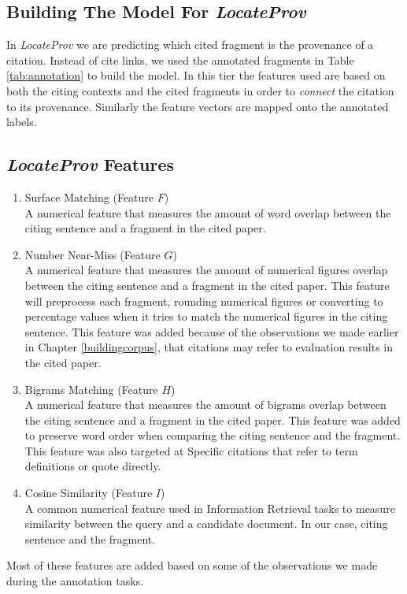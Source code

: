 \subsection*{Building The Model For {\it LocateProv}}
In {\it LocateProv} we are predicting which cited fragment is the provenance of a citation. Instead of cite links, we used the annotated fragments in Table \ref{tab:annotation} to build the model. In this tier the features used are based on both the citing contexts and the cited fragments in order to {\it connect} the citation to its provenance. Similarly the feature vectors are mapped onto the annotated labels.

\subsection*{{\it LocateProv} Features}
\begin{enumerate}
\item Surface Matching (Feature $F$)\\
A numerical feature that measures the amount of word overlap between the citing sentence and a fragment in the cited paper.

\item Number Near-Miss (Feature $G$)\\
A numerical feature that measures the amount of numerical figures overlap between the citing sentence and a fragment in the cited paper. This feature will preprocess each fragment, rounding numerical figures or converting to percentage values when it tries to match the numerical figures in the citing sentence. This feature was added because of the observations we made earlier in Chapter \ref{buildingcorpus}, that citations may refer to evaluation results in the cited paper.

\item Bigrams Matching (Feature $H$)\\
A numerical feature that measures the amount of bigrams overlap between the citing sentence and a fragment in the cited paper. This feature was added to preserve word order when comparing the citing sentence and the fragment. This feature was also targeted at Specific citations that refer to term definitions or quote directly.

\item Cosine Similarity (Feature $I$)\\
A common numerical feature used in Information Retrieval tasks to measure similarity between the query and a candidate document. In our case, citing sentence and the fragment.
\end{enumerate}
Most of these features are added based on some of the observations we made during the annotation tasks.

